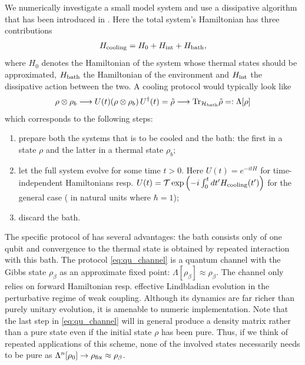 \documentclass[12pt,a4paper]{article}
\newcommand{\Tr}{{\operatorname{Tr}}}
\begin{document}
We numerically investigate a small model system and use a dissipative algorithm that has been introduced in \citet{ding2025}. Here the total system's Hamiltonian has three contributions
\begin{align}\label{eq:hamiltonian_parts}
    H_{\rm cooling} = H_0 + H_{\rm int} + H_{\rm bath},
\end{align} where $H_0$ denotes the Hamiltonian of the system whose thermal states should be approximated, $H_{\rm bath}$ the Hamiltonian of the environment and $H_{\rm int}$ the dissipative action between the two. A cooling protocol would typically look like
\begin{align}\label{eq:qu_channel}
\rho\otimes\rho_b \longrightarrow U(t)(\rho\otimes\rho_b)\, U^{\dagger}(t)=\Tilde{\rho}  \longrightarrow \Tr_{\mathcal H_{\rm bath}} \Tilde{\rho}  =: \Lambda[\rho]
\end{align}
which corresponds to the following steps:
\begin{enumerate}
    \item prepare both the systems that is to be cooled and the bath: the first in a state $\rho$ and the latter in a thermal state $\rho_b$;
    \item  let the full system evolve for some time $t>0$. Here $U(t) = e^{-i t H}$ for time-independent Hamiltonians resp. $U(t)=\mathcal{T} \exp\left(-i \int_{0}^{ t} dt' H_{\rm cooling} (t') \right)$ for the general case (%
    in natural units where $\hbar = 1$);
    \item discard the bath. %
\end{enumerate}
The specific %
protocol of \citet{ding2025} has several advantages: the bath consists only of one qubit and convergence to the thermal state is obtained by repeated interaction with this bath. The protocol \cref{eq:qu_channel} is a quantum channel with the Gibbs state $\rho_{\beta}$ as an approximate fixed point: $\Lambda[\rho_{\beta}]\approx \rho_{\beta}$. The channel only relies on forward Hamiltonian resp. effective Lindbladian evolution in the perturbative regime of weak coupling. Although its dynamics are far richer than purely unitary evolution, it is amenable to numeric implementation.  Note that the last step in \cref{eq:qu_channel} will in general produce a density matrix rather than a pure state even if the initial state $\rho$ has been pure. Thus, if we think of repeated applications of this scheme, none of the involved states necessarily needs to  be pure as $\Lambda^n[\rho_0]\to \rho_{\rm fix}\approx \rho_{\beta}$. 
\end{document}
